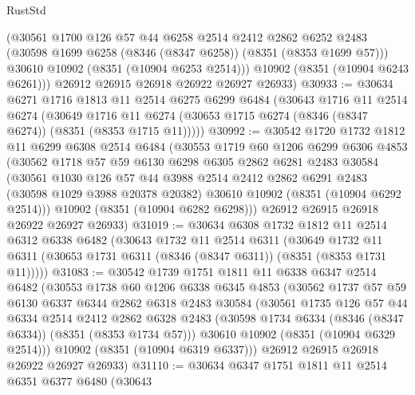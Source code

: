 \begin{lexlean}{RustStd}
\begin{coremodule}
        (@30561
          @1700
          @126
          @57
          @44
          @6258
          @2514
          @2412
          @2862
          @6252
          @2483
          (@30598 @1699 @6258 (@8346 (@8347 @6258)) (@8351 (@8353 @1699 @57)))
          @30610
          @10902
          (@8351 (@10904 @6253 @2514)))
        @10902
        (@8351 (@10904 @6243 @6261)))
      @26912
      @26915
      @26918
      @26922
      @26927
      @26933)
@30933 := @30634
    @6271
    @1716
    @1813
    @11
    @2514
    @6275
    @6299
    @6484
    (@30643
      @1716
      @11
      @2514
      @6274
      (@30649 @1716 @11 @6274 (@30653 @1715 @6274 (@8346 (@8347 @6274)) (@8351 (@8353 @1715 @11)))))
@30992 := @30542
    @1720
    @1732
    @1812
    @11
    @6299
    @6308
    @2514
    @6484
    (@30553
      @1719
      @60
      @1206
      @6299
      @6306
      @4853
      (@30562
        @1718
        @57
        @59
        @6130
        @6298
        @6305
        @2862
        @6281
        @2483
        @30584
        (@30561
          @1030
          @126
          @57
          @44
          @3988
          @2514
          @2412
          @2862
          @6291
          @2483
          (@30598 @1029 @3988 @20378 @20382)
          @30610
          @10902
          (@8351 (@10904 @6292 @2514)))
        @10902
        (@8351 (@10904 @6282 @6298)))
      @26912
      @26915
      @26918
      @26922
      @26927
      @26933)
@31019 := @30634
    @6308
    @1732
    @1812
    @11
    @2514
    @6312
    @6338
    @6482
    (@30643
      @1732
      @11
      @2514
      @6311
      (@30649 @1732 @11 @6311 (@30653 @1731 @6311 (@8346 (@8347 @6311)) (@8351 (@8353 @1731 @11)))))
@31083 := @30542
    @1739
    @1751
    @1811
    @11
    @6338
    @6347
    @2514
    @6482
    (@30553
      @1738
      @60
      @1206
      @6338
      @6345
      @4853
      (@30562
        @1737
        @57
        @59
        @6130
        @6337
        @6344
        @2862
        @6318
        @2483
        @30584
        (@30561
          @1735
          @126
          @57
          @44
          @6334
          @2514
          @2412
          @2862
          @6328
          @2483
          (@30598 @1734 @6334 (@8346 (@8347 @6334)) (@8351 (@8353 @1734 @57)))
          @30610
          @10902
          (@8351 (@10904 @6329 @2514)))
        @10902
        (@8351 (@10904 @6319 @6337)))
      @26912
      @26915
      @26918
      @26922
      @26927
      @26933)
@31110 := @30634
    @6347
    @1751
    @1811
    @11
    @2514
    @6351
    @6377
    @6480
    (@30643

\end{coremodule}
\end{lexlean}
